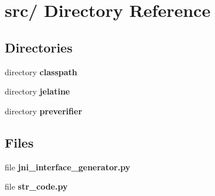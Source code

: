 \section{src/ Directory Reference}
\label{dir_6a6c920235cc4412e2fe4008824cbf5e}
\subsection*{Directories}
\begin{DoxyCompactItemize}
\item 
directory {\bf classpath}
\item 
directory {\bf jelatine}
\item 
directory {\bf preverifier}
\end{DoxyCompactItemize}
\subsection*{Files}
\begin{DoxyCompactItemize}
\item 
file {\bfseries jni\_\-interface\_\-generator.py}
\item 
file {\bfseries str\_\-code.py}
\end{DoxyCompactItemize}
